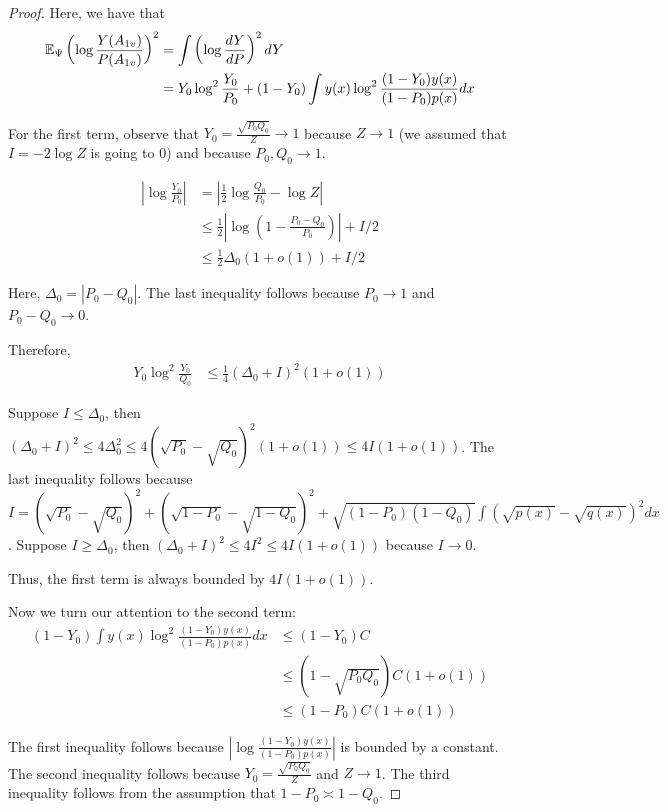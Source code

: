 \begin{proof}
Here, we have that
\begin{align*}
{\mathbb E}_{\Psi} \left( \log \frac{Y(A_{1v})}{P(A_{1v})} \right)^2 &= 
    \int \left( \log \frac{dY}{dP} \right)^2 dY \\
  &= Y_0 \log^2 \frac{Y_0}{P_0} + (1-Y_0) \int y(x) \log^2 \frac{(1-Y_0) y(x)}{(1-P_0)p(x)} dx \\
\end{align*}

For the first term, observe that $Y_0 = \frac{\sqrt{P_0 Q_0}}{Z} \rightarrow 1$ because $Z \rightarrow 1$ (we assumed that $I = -2\log Z$ is going to 0) and because $P_0, Q_0 \rightarrow 1$.

\begin{align*}
\left| \log \frac{Y_0}{P_0} \right|&= \left| \frac{1}{2} \log \frac{Q_0}{P_0} - \log Z \right| \\
    &\leq \frac{1}{2} \left| \log \left( 1 - \frac{P_0 - Q_0}{P_0} \right) \right| + I/2 \\ 
  &\leq \frac{1}{2} \Delta_0 (1 + o(1)) + I/2 
\end{align*}

Here, $\Delta_0 = | P_0 - Q_0|$. The last inequality follows because $P_0 \rightarrow 1$ and $P_0 - Q_0 \rightarrow 0$. 

Therefore, 
\begin{align*}
Y_0 \log^2 \frac{Y_0}{Q_0}  &\leq \frac{1}{4} ( \Delta_0 + I)^2 (1 + o(1))
\end{align*}

Suppose $I \leq \Delta_0$, then $(\Delta_0 + I)^2 \leq 4 \Delta_0^2 \leq 4 (\sqrt{P_0} - \sqrt{Q_0})^2 (1 + o(1)) \leq 4 I (1 + o(1))$. The last inequality follows because $I = (\sqrt{P_0} - \sqrt{Q_0})^2 +  (\sqrt{1-P_0} - \sqrt{1-Q_0})^2 + \sqrt{(1-P_0)(1-Q_0)} \int (\sqrt{p(x)} - \sqrt{q(x)})^2 dx$. 
Suppose $I \geq \Delta_0$, then $(\Delta_0 + I)^2 \leq 4 I^2 \leq 4 I ( 1+ o(1))$ because $I \rightarrow 0$. 

Thus, the first term is always bounded by $4 I ( 1 + o(1))$. 

Now we turn our attention to the second term:
\begin{align*}
 (1-Y_0) \int y(x) \log^2 \frac{(1-Y_0) y(x)}{(1-P_0)p(x)} dx 
    &\leq (1 - Y_0) C  \\
    &\leq (1 - \sqrt{P_0 Q_0})C (1 + o(1)) \\
    &\leq (1 - P_0) C (1 + o(1))
\end{align*}

The first inequality follows because $\left| \log \frac{(1-Y_0)y(x)}{(1-P_0)p(x)} \right|$ is bounded by a constant. The second inequality follows because $Y_0 = \frac{\sqrt{P_0 Q_0}}{Z}$ and $Z \rightarrow 1$. The third inequality follows from the assumption that $1 - P_0 \asymp 1 - Q_0$. 


\end{proof}
